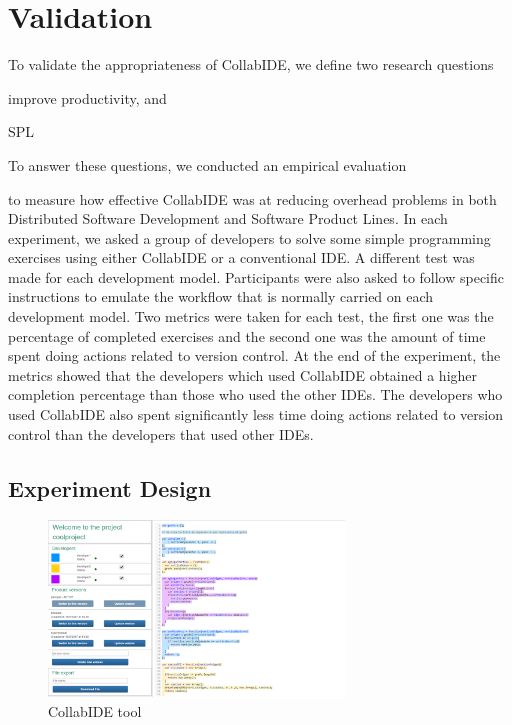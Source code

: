 

\section{Validation}
\label{sec:validation}

To validate the appropriateness of CollabIDE, we define two research questions
\begin{enumerate*}[label=(\arabic*)]
\item improve productivity, and
\item SPL
\end{enumerate*} 
To answer these questions, we conducted an empirical evaluation 

to measure how effective CollabIDE was at reducing overhead problems 
in both Distributed Software Development and Software Product Lines. In each experiment, we asked 
a group of developers to solve some simple programming exercises using either CollabIDE or a 
conventional IDE. A different test was made for each development model. Participants were also 
asked to follow specific instructions to emulate the workflow that is normally carried on each 
development model. Two metrics were taken for each test, the first one was the percentage of 
completed exercises and the second one was the amount of time spent doing actions related to 
version control.
At the end of the experiment, the metrics showed that the developers which used CollabIDE obtained 
a higher completion percentage than those who used the other IDEs. The developers who used 
CollabIDE also spent significantly less time doing actions related to version control than the 
developers that used other IDEs.

\subsection{Experiment Design}

\begin{figure}[htbp]
  \centering
  \includegraphics[width=0.7\textwidth]{img/fig1-collabIDEGeneral}
  \caption{CollabIDE tool}
  \label{fig:collabide}
\end{figure}


